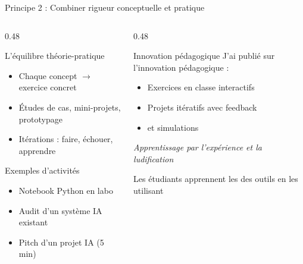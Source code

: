 \documentclass[aspectratio=169,11pt]{beamer}
\begin{document}
\begin{frame}{Principe 2 : Combiner rigueur conceptuelle et pratique}
  \begin{columns}[T]
    \begin{column}{0.48\textwidth}
      \begin{block}{L'équilibre théorie-pratique}
        \begin{itemize}
          \item Chaque concept $\rightarrow$ exercice concret
          \item Études de cas, mini-projets, prototypage
          \item Itérations : faire, échouer, apprendre
        \end{itemize}
      \end{block}
      
      \vspace{0.3em}
      
      \begin{exampleblock}{Exemples d'activités}
        \small
        \begin{itemize}
          \item Notebook Python en labo
          \item Audit d'un système IA existant
          \item Pitch d'un projet IA (5 min)
        \end{itemize}
      \end{exampleblock}
    \end{column}
    \begin{column}{0.48\textwidth}
      \begin{alertblock}{Innovation pédagogique}
        J'ai publié sur l'innovation pédagogique :
        \begin{itemize}
          \item Exercices en classe interactifs
          \item Projets itératifs avec feedback
          \item {} et simulations
        \end{itemize}
        
        \vspace{0.2em}
        
        {\scriptsize \textit{Apprentissage par l'expérience et la ludification}}
      \end{alertblock}
      
      \vspace{0.3em}
      
      {\small Les étudiants apprennent les  des outils en les utilisant}
    \end{column}
  \end{columns}
\end{frame}
\end{document}
